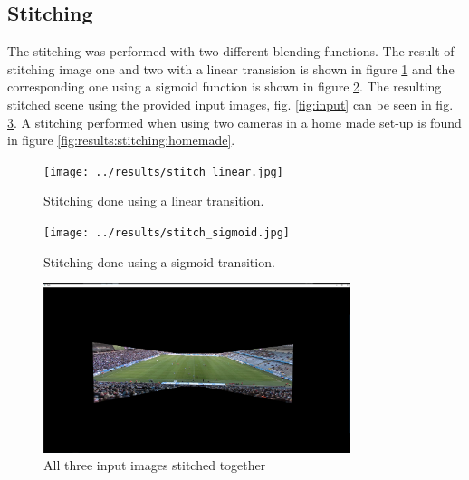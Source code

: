 \subsection{Stitching}
The stitching was performed with two different blending functions. The result of stitching image one and two with a linear transision is shown in figure \ref{fig:results:stitching:linear} and the corresponding one using a sigmoid function is shown in figure \ref{fig:results:stitching:sigmoid}. The resulting stitched scene using the provided input images, fig. \ref{fig:input} can be seen in fig. \ref{fig:res_stitch}. A stitching performed when using two cameras in a home made set-up is found in figure \ref{fig:results:stitching:homemade}.

\begin{figure}[H]
  \centering
  \texttt{[image: ../results/stitch\_linear.jpg]}
  \caption{Stitching done using a linear transition.}
  \label{fig:results:stitching:linear}
\end{figure}

\begin{figure}[H]
  \centering
  \texttt{[image: ../results/stitch\_sigmoid.jpg]}
  \caption{Stitching done using a sigmoid transition.}
  \label{fig:results:stitching:sigmoid}
\end{figure}

\begin{figure}
	\centering
	\includegraphics[width=0.8\textwidth]{../results/images/res_stitch.PNG}
	\caption{All three input images stitched together}
	\label{fig:res_stitch}
\end{figure}

